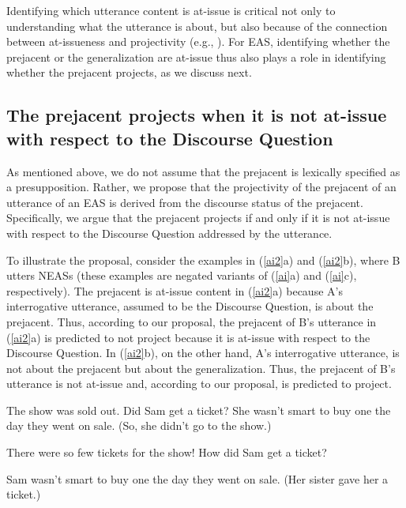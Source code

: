 \documentclass[11pt,fleqn]{article}
\newcommand{\6}{\mbox{$[\hspace*{-.6mm}[$}}
\newcommand{\9}{\mbox{$]\hspace*{-.6mm}]$}}
\begin{document}
Identifying which utterance content is at-issue is critical not only to understanding what the utterance is about, but also because of the connection between at-issueness and projectivity (e.g., \citealt{potts05,brst-salt10,best-question,brst-ar}). For EAS, identifying whether the prejacent or the generalization are at-issue thus also plays a role in identifying whether the prejacent projects, as we discuss next.

\subsection{The prejacent projects when it is not at-issue with respect to the Discourse Question}

As mentioned above, we do not assume that the prejacent is lexically specified as a presupposition. Rather, we propose that the projectivity of the prejacent of an utterance of an EAS is derived from the discourse status of the prejacent. Specifically, we argue that the prejacent projects if and only if it is not at-issue with respect to the Discourse Question addressed by the utterance. 

To illustrate the proposal, consider the examples in (\ref{ai2}a) and (\ref{ai2}b), where B utters NEASs (these examples are negated variants of (\ref{ai}a) and (\ref{ai}c), respectively). The prejacent is at-issue content in (\ref{ai2}a) because A's interrogative utterance, assumed to be the Discourse Question, is about the prejacent. Thus, according to our proposal, the prejacent of B's utterance in (\ref{ai2}a) is predicted to not project because it is at-issue with respect to the Discourse Question. In (\ref{ai2}b), on the other hand, A's interrogative utterance, is not about the prejacent but about the generalization. Thus, the prejacent of B's utterance is not at-issue and, according to our proposal, is predicted to project. 


\begin{exe}
\ex\label{ai2}

\begin{xlist}
\ex
\begin{xlist}
 The show was sold out. Did Sam get a ticket?
 She wasn't smart to buy one the day they went on sale. (So, she didn't go to the show.)
\end{xlist}

\ex
\begin{xlist}
 There were so few tickets for the show! How did Sam get a ticket?

 Sam wasn't smart to buy one the day they went on sale. (Her sister gave her a ticket.)

\end{xlist}

\end{xlist}
\end{exe}
\end{document}
